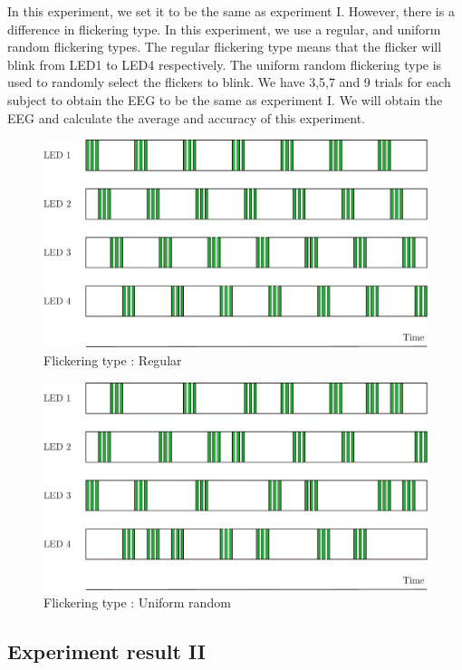 In this experiment, we set it to be the same as experiment I. However, there is a difference in flickering type. In this experiment, we use a regular, and uniform random flickering types. The regular flickering type means that the flicker will blink from LED1 to LED4 respectively. The uniform random flickering type is used to randomly select the flickers to blink. We have 3,5,7 and 9 trials for each subject to obtain the EEG to be the same as experiment I. We will obtain the EEG and calculate the average and accuracy of this experiment.


\begin{figure}[ht]
	\centering
	\includegraphics[scale = 0.65]{chapter7/mod_nor.pdf}
	\caption{Flickering type : Regular}
\end{figure}

\begin{figure}[ht]
	\centering
	\includegraphics[scale = 0.65]{chapter7/mod_uni.pdf}
	\caption{Flickering type : Uniform random}
\end{figure}

\newpage
\subsection{Experiment result II}


